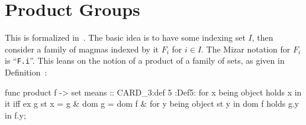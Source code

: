 \section{Product Groups}

This is formalized in~. The basic idea is to have some
indexing set $I$, then consider a family of magmas indexed by it $F_{i}$
for $i\in I$. The Mizar notation for $F_{i}$ is ``\lstinline{F.i}''.
This leans on the notion of a product of a family of sets, as given in
Definition~:

\begin{mizar}
func product f -> set means :: CARD_3:def 5
:Def5: for x being object holds x in it iff
  ex g st x = g & dom g = dom f &
          for y being object st y in dom f
          holds g.y in f.y;
\end{mizar}
